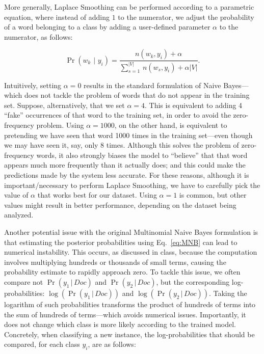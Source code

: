 \documentclass{article}
\begin{document}
\begin{itemize}
More generally, Laplace Smoothing can be performed according to a parametric equation, where instead of adding $1$ to the numerator, we adjust the probability of a word belonging to a class by adding a user-defined parameter $\alpha$ to the numerator, as follows:

\begin{equation}
    \Pr\left(w_k\,\,|\,\,y_i\right) = \frac{n(w_k, y_i) + \alpha}{\sum_{s=1}^{|V|} \, n(w_s, y_i) + \alpha |V|}.
\end{equation}

Intuitively, setting $\alpha = 0$ results in the standard formulation of Naive Bayes---which does not tackle the problem of words that do not appear in the training set. Suppose, alternatively, that we set $\alpha=4$. This is equivalent to adding 4 ``fake'' occurrences of that word to the training set, in order to avoid the zero-frequency problem. Using $\alpha=1000$, on the other hand, is equivalent to pretending we have seen that word 1000 times in the training set---even though we may have seen it, say, only 8 times. Although this solves the problem of zero-frequency words, it also strongly biases the model to ``believe'' that that word appears much more frequently than it actually does; and this could make the predictions made by the system less accurate. For these reasons, although it is important/necessary to perform Laplace Smoothing, we have to carefully pick the value of $\alpha$ that works best for our dataset. Using $\alpha=1$ is common, but other values might result in better performance, depending on the dataset being analyzed.
\vspace{0.15cm}

Another potential issue with the original Multinomial Naive Bayes formulation is that estimating the posterior probabilities using Eq.~\eqref{eq:MNB} can lead to numerical instability. This occurs, as discussed in class, because the computation involves multiplying hundreds or thousands of small terms, causing the probability estimate to rapidly approach zero. To tackle this issue, we often compare not $\Pr(y_1 \, | \, Doc)$ and $\Pr(y_2 \, | \, Doc)$, but the corresponding log-probabilities: $\log(\Pr(y_1 \, | \, Doc))$ and $\log(\Pr(y_2 \, | \, Doc))$. Taking the logarithm of such probabilities transforms the product of hundreds of terms into the sum of hundreds of terms---which avoids numerical issues. Importantly, it does not change which class is more likely according to the trained model. Concretely, when classifying a new instance, the log-probabilities that should be compared, for each class $y_i$, are as follows:


\end{itemize}
\end{document}
